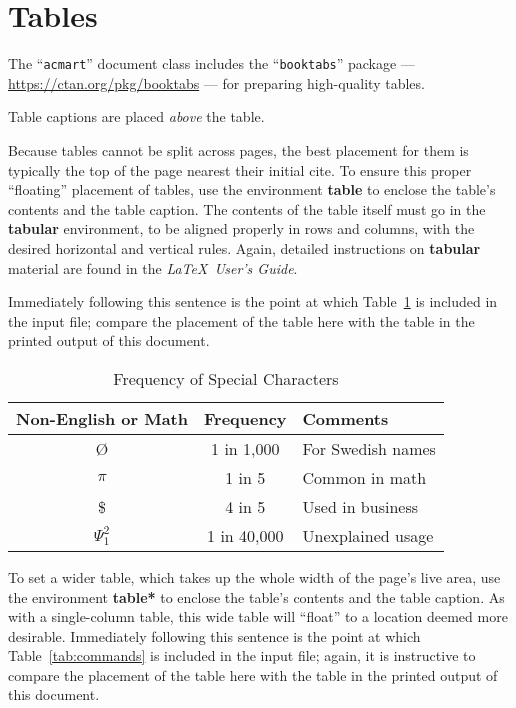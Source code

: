 \documentclass[sigplan,screen,nonacm]{acmart}
\begin{document}
\section{Tables}

The ``\verb|acmart|'' document class includes the ``\verb|booktabs|''
package --- \url{https://ctan.org/pkg/booktabs} --- for preparing
high-quality tables.

Table captions are placed \textit{above} the table.

Because tables cannot be split across pages, the best placement for
them is typically the top of the page nearest their initial cite.  To
ensure this proper ``floating'' placement of tables, use the
environment \textbf{table} to enclose the table's contents and the
table caption.  The contents of the table itself must go in the
\textbf{tabular} environment, to be aligned properly in rows and
columns, with the desired horizontal and vertical rules.  Again,
detailed instructions on \textbf{tabular} material are found in the
\textit{\LaTeX\ User's Guide}.

Immediately following this sentence is the point at which
Table~\ref{tab:freq} is included in the input file; compare the
placement of the table here with the table in the printed output of
this document.

\begin{table}
  \caption{Frequency of Special Characters}
  \label{tab:freq}
  \begin{tabular}{ccl}
    \toprule
    Non-English or Math&Frequency&Comments\\
    \midrule
    \O & 1 in 1,000& For Swedish names\\
    $\pi$ & 1 in 5& Common in math\\
    \$ & 4 in 5 & Used in business\\
    $\Psi^2_1$ & 1 in 40,000& Unexplained usage\\
  \bottomrule
\end{tabular}
\end{table}

To set a wider table, which takes up the whole width of the page's
live area, use the environment \textbf{table*} to enclose the table's
contents and the table caption.  As with a single-column table, this
wide table will ``float'' to a location deemed more
desirable. Immediately following this sentence is the point at which
Table~\ref{tab:commands} is included in the input file; again, it is
instructive to compare the placement of the table here with the table
in the printed output of this document.
\end{document}

